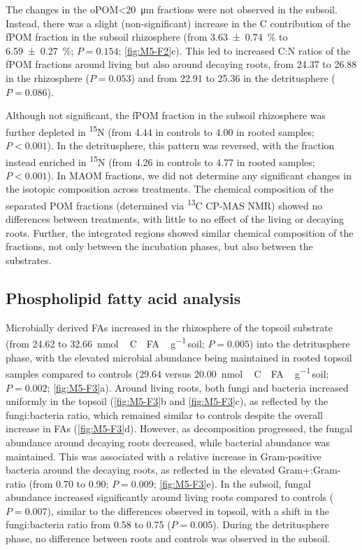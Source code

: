The changes in the oPOM<\SI{20}{\micro\metre} fractions were not observed in the subsoil. Instead, there was a slight (non-significant) increase in the C contribution of the fPOM fraction in the subsoil rhizosphere (from \SI{3.63 \pm 0.74}{\percent} to \SI{6.59 \pm 0.27}{\percent}; \(P=0.154\); \ref{fig:M5-F2}c). This led to increased C:N ratios of the fPOM fractions around living but also around decaying roots, from \num{24.37} to \num{26.88} in the rhizosphere (\(P=0.053\)) and from \num{22.91} to \num{25.36} in the detritusphere (\(P=0.086\)).

Although not significant, the fPOM fraction in the subsoil rhizosphere was further depleted in \textsuperscript{15}N (from \num{4.44} in controls to \SI{4.00}{\permil} in rooted samples; \(P < 0.001\)). In the detritusphere, this pattern was reversed, with the fraction instead enriched in \textsuperscript{15}N (from \num{4.26} in controls to \SI{4.77}{\permil} in rooted samples; \(P < 0.001\)). In MAOM fractions, we did not determine any significant changes in the isotopic composition across treatments. The chemical composition of the separated POM fractions (determined via \textsuperscript{13}C CP-MAS NMR) showed no differences between treatments, with little to no effect of the living or decaying roots. Further, the integrated regions showed similar chemical composition of the fractions, not only between the incubation phases, but also between the substrates.

\subsection{Phospholipid fatty acid analysis}

Microbially derived FAs increased in the rhizosphere of the topsoil substrate (from \num{24.62} to \SI{32.66}{nmol\,C\text{-}FA\,\gram^{-1}}\,soil; \(P=0.005\)) into the detritusphere phase, with the elevated microbial abundance being maintained in rooted topsoil samples compared to controls (\num{29.64} versus \SI{20.00}{nmol\,C\text{-}FA\,\gram^{-1}}\,soil; \(P=0.002\); \ref{fig:M5-F3}a). Around living roots, both fungi and bacteria increased uniformly in the topsoil (\ref{fig:M5-F3}b and \ref{fig:M5-F3}c), as reflected by the fungi:bacteria ratio, which remained similar to controls despite the overall increase in FAs (\ref{fig:M5-F3}d). However, as decomposition progressed, the fungal abundance around decaying roots decreased, while bacterial abundance was maintained. This was associated with a relative increase in Gram-positive bacteria around the decaying roots, as reflected in the elevated Gram+:Gram- ratio (from \num{0.70} to \num{0.90}; \(P=0.009\); \ref{fig:M5-F3}e). In the subsoil, fungal abundance increased significantly around living roots compared to controls (\(P=0.007\)), similar to the differences observed in topsoil, with a shift in the fungi:bacteria ratio from \num{0.58} to \num{0.75} (\(P=0.005\)). During the detritusphere phase, no difference between roots and controls was observed in the subsoil.


